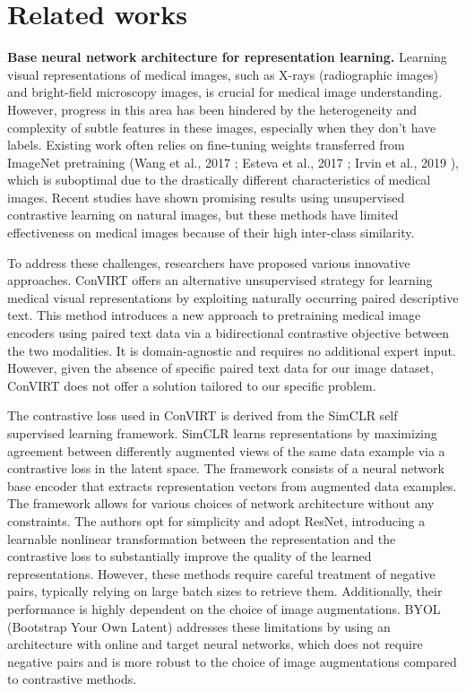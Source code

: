 \documentclass[12pt,twoside,a4paper,parskip]{scrbook} %
\begin{document}
\chapter{Related works}\label{ch:Related works}
\textbf{Base neural network architecture for representation learning.} Learning visual representations of medical images, such as X-rays (radiographic images) and bright-field microscopy images, is crucial for medical image understanding. However, progress in this area has been hindered by the heterogeneity and complexity of subtle features in these images, especially when they don't have labels. Existing work often relies on fine-tuning weights transferred from ImageNet pretraining (Wang et al., 2017 \cite{8099852} ; Esteva et al., 2017 \cite{Esteva2017Dermatologist} ; Irvin et al., 2019 \cite{irvin2019chexpert} ), which is suboptimal due to the drastically different characteristics of medical images. Recent studies have shown promising results using unsupervised contrastive learning on natural images, but these methods have limited effectiveness on medical images because of their high inter-class similarity.

To address these challenges, researchers have proposed various innovative approaches. ConVIRT \cite{zhang2022contrastive} offers an alternative unsupervised strategy for learning medical visual representations by exploiting naturally occurring paired descriptive text. This method introduces a new approach to pretraining medical image encoders using paired text data via a bidirectional contrastive objective between the two modalities. It is domain-agnostic and requires no additional expert input.  However, given the absence of specific paired text data for our image dataset, ConVIRT does not offer a solution tailored to our specific problem.

The contrastive loss used in ConVIRT is derived from the SimCLR \cite{chen2020simple} self supervised learning framework. SimCLR learns representations by maximizing agreement between differently augmented views of the same data example via a contrastive loss in the latent space. The framework consists of a neural network base encoder that extracts representation vectors from augmented data examples. The framework allows for various choices of network architecture without any constraints. The authors opt for simplicity and adopt ResNet, introducing a learnable nonlinear transformation between the representation and the contrastive loss to substantially improve the quality of the learned representations. However, these methods require careful treatment of negative pairs, typically relying on large batch sizes to retrieve them. Additionally, their performance is highly dependent on the choice of image augmentations. BYOL (Bootstrap Your Own Latent) \cite{grill2020bootstrap} addresses these limitations by using an architecture with online and target neural networks, which does not require negative pairs and is more robust to the choice of image augmentations compared to contrastive methods.
\end{document}
